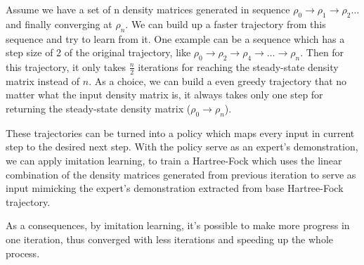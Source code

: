 \documentclass[twoside]{article}
\begin{document}

Assume we have a set of n density matrices generated in sequence   $\rho_0 \rightarrow  \rho_1 \rightarrow  \rho_2  \ldots  $ and finally converging at $\rho_{n}$. 
We can build up a faster trajectory from this sequence and try to learn from it.
One example can be a sequence which has a step size of 2 of the original trajectory, like $\rho_0 \rightarrow \rho_2 \rightarrow  \rho_4 \rightarrow  \ldots \rightarrow  \rho_{n}$. Then for this trajectory, it only takes $\frac{n}{2}$ iterations for reaching the steady-state density matrix instead of $n$.
As a choice, we can build a even greedy trajectory that no matter what the input density matrix is, it always takes only one step for returning the steady-state density matrix ($\rho_0 \rightarrow \rho_{n}$).


These trajectories can be turned into a policy which maps every input in current step to the desired next step. With the policy  serve as an expert's demonstration, we can apply imitation learning, to train a Hartree-Fock which uses the linear combination of the density matrices generated from previous iteration to serve as input mimicking the expert's demonstration extracted from base Hartree-Fock trajectory.

As a consequences, by imitation learning, it's possible to make more progress in one iteration, thus converged with less iterations and speeding up the whole process.  




\end{document}
